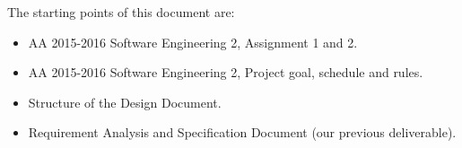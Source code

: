 The starting points of this document are:
    \begin{itemize}
       \item AA 2015-2016 Software Engineering 2, Assignment 1 and 2.
       \item AA 2015-2016 Software Engineering 2, Project goal, schedule and rules.
       \item Structure of the Design Document.
       \item Requirement Analysis and Specification Document (our previous deliverable).
    \end{itemize}